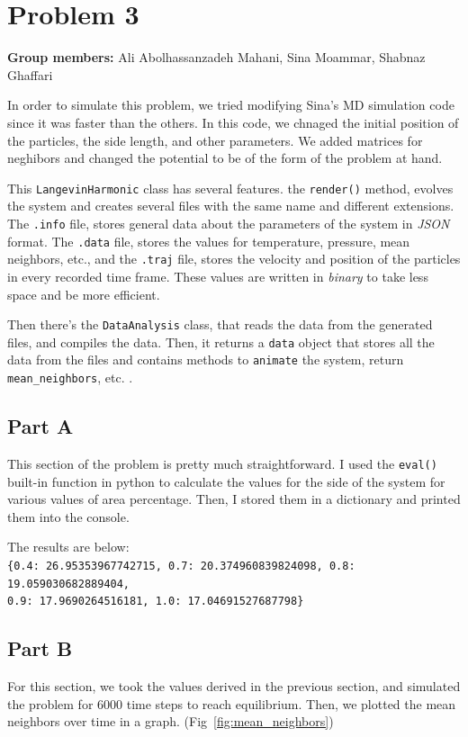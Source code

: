 \documentclass[12pt, a4paper]{article}
\begin{document}
	\section{Problem 3}
	\textbf{Group members:} Ali Abolhassanzadeh Mahani, Sina Moammar, Shabnaz Ghaffari
	
	In order to simulate this problem, we tried modifying Sina's MD simulation code since it was faster than the others. In this code, we chnaged the 
	initial position of the particles, the side length, and other parameters. We added matrices for neghibors and changed the potential to be of 
	the form of the problem at hand. 
	
	This \texttt{LangevinHarmonic} class has several features. the \texttt{render()} method, evolves the system and creates several files with the
	same name and different extensions. The \texttt{.info} file, stores general data about the parameters of the system in \emph{JSON} format.
	The \texttt{.data} file, stores the values for temperature, pressure, mean neighbors, etc., and the \texttt{.traj} file, stores the velocity and
	position of the particles in every recorded time frame. These values are written in \emph{binary} to take less space and be more efficient.
	
	Then there's the \texttt{DataAnalysis} class, that reads the data from the generated files, and compiles the data. Then, it returns a \texttt{data}
	object that stores all the data from the files and contains methods to \texttt{animate} the system, return \texttt{mean\_neighbors}, etc. .
	
	\subsection{Part A}
	This section of the problem is pretty much straightforward. I used the \texttt{eval()} built-in function in python to calculate the values for 
	the side of the system for various values of area percentage. Then, I stored them in a dictionary and printed them into the console.
		
	The results are below:\\
	\texttt{\{0.4: 26.95353967742715, 0.7: 20.374960839824098, 0.8: 19.059030682889404, \\0.9: 17.9690264516181, 1.0: 17.04691527687798\}}
	\subsection{Part B}
	For this section, we took the values derived in the previous section, and simulated the problem for 6000 time steps to reach equilibrium. Then,
	we plotted the mean neighbors over time in a graph. (Fig~\ref{fig:mean_neighbors})
	
\end{document}
